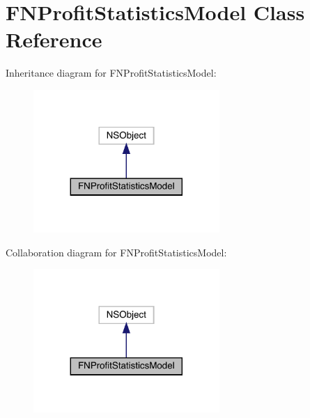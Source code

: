 \hypertarget{interface_f_n_profit_statistics_model}{}\section{F\+N\+Profit\+Statistics\+Model Class Reference}
\label{interface_f_n_profit_statistics_model}


Inheritance diagram for F\+N\+Profit\+Statistics\+Model\+:\nopagebreak
\begin{figure}[H]
\begin{center}
\leavevmode
\includegraphics[width=200pt]{interface_f_n_profit_statistics_model__inherit__graph}
\end{center}
\end{figure}


Collaboration diagram for F\+N\+Profit\+Statistics\+Model\+:\nopagebreak
\begin{figure}[H]
\begin{center}
\leavevmode
\includegraphics[width=200pt]{interface_f_n_profit_statistics_model__coll__graph}
\end{center}
\end{figure}

